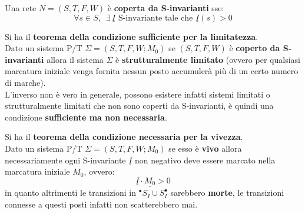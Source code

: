 \documentclass[a4paper,12pt, oneside]{book}
\begin{document}
\newpage
\begin{definizione}
  Una rete $N = (S, T , F , W )$ è\textbf{ coperta da S-invarianti} sse:
  \[\forall s\in S,\,\,\,\exists\, \underline{I} \mbox{ S-invariante tale che }
    \underline{I}(s)>0\] 
\end{definizione}
\begin{teorema}
  Si ha il \textbf{teorema della condizione sufficiente per la limitatezza}.\\
  Dato un sistema P/T $\Sigma=(S,T,F,W;M_0)$ se $(S,T,F,W)$ è \textbf{coperto da
    S-invarianti} allora il sistema $\Sigma$ è \textbf{strutturalmente limitato}
  (ovvero per qualsiasi marcatura iniziale venga fornita nessun posto accumulerà
  più di un certo numero di marche).\\
  L’inverso non è vero in generale, possono esistere infatti sistemi limitati o
  strutturalmente limitati che non sono coperti da S-invarianti, è quindi una
  condizione \textbf{sufficiente ma non necessaria}.
\end{teorema}
\begin{teorema}
  Si ha il \textbf{teorema della condizione necessaria per la vivezza}.\\
  Dato un sistema P/T $\Sigma=(S,T,F,W;M_0)$ se esso è \textbf{vivo} allora
  necessariamente ogni S-invariante $\underline{I}$ non negativo deve essere
  marcato nella marcatura iniziale $M_0$, ovvero:
  \[\underline{I}\cdot \underline{M_0}>0\]
  in quanto altrimenti le transizioni in $^\bullet S_I\cup S_I^\bullet$
  sarebbero \textbf{morte}, le transizioni connesse a questi posti infatti non
  scatterebbero mai.
\end{teorema}
\end{document}
